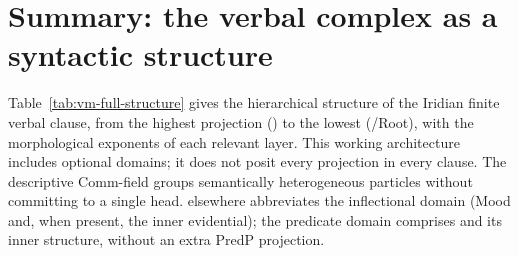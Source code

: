 
\section{Summary: the verbal complex as a syntactic structure}
\label{sec:vm-summary}

Table~\ref{tab:vm-full-structure} gives the hierarchical structure
of the Iridian finite verbal clause, from the highest projection
() to the lowest (/Root), with the morphological
exponents of each relevant layer. This working architecture includes optional
domains; it does not posit every projection in every clause. The descriptive
Comm-field groups semantically heterogeneous particles without committing to
a single head.  elsewhere abbreviates the inflectional domain
(Mood and, when present, the inner evidential); the predicate domain comprises
 and its inner structure, without an extra PredP projection.

